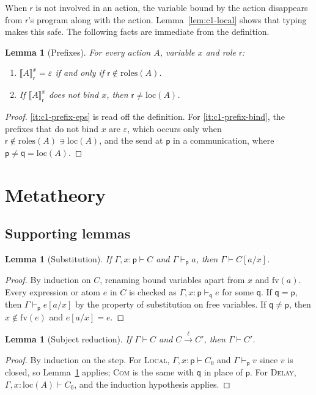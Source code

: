 \documentclass[11pt]{report}
\theoremstyle{plain}
\newtheorem{lemma}[theorem]{Lemma}
\theoremstyle{definition}
\theoremstyle{remark}
\newcommand{\pp}{\mathsf{p}}
\newcommand{\qq}{\mathsf{q}}
\newcommand{\rr}{\mathsf{r}}
\newcommand{\fv}{\mathrm{fv}}
\newcommand{\roles}[1]{\mathrm{roles}(#1)}
\newcommand{\loc}[1]{\mathrm{loc}(#1)}
\newcommand{\lto}[1]{\xrightarrow{\;#1\;}}
\newcommand{\pre}[3]{\llbracket #1 \rrbracket^{#2}_{#3}}
\newcommand{\rn}[1]{{\normalfont\scshape #1}}
\begin{document}
When $\rr$ is not involved in an action, the variable bound by the action
disappears from $\rr$'s program along with the action.
Lemma~\ref{lem:c1-local} shows that typing makes this safe.  The following
facts are immediate from the definition.

\begin{lemma}[Prefixes]\label{lem:c1-prefix}
  For every action $A$, variable $x$ and role $\rr$:
  \begin{enumerate}[label=(\roman*),nosep]
  \item\label{it:c1-prefix-eps} $\pre{A}{x}{\rr}=\varepsilon$ if and only if $\rr\notin\roles{A}$.
  \item\label{it:c1-prefix-bind} If $\pre{A}{x}{\rr}$ does not bind $x$, then $\rr\neq\loc{A}$.
  \end{enumerate}
\end{lemma}
\begin{proof}
  \ref{it:c1-prefix-eps} is read off the definition.  For
  \ref{it:c1-prefix-bind}, the prefixes that do not bind $x$ are $\varepsilon$,
  which occurs only when $\rr\notin\roles{A}\ni\loc{A}$, and the send at $\pp$
  in a communication, where $\pp\neq\qq=\loc{A}$.
\end{proof}

\section{Metatheory}
\label{sec:c1-meta}

\subsection{Supporting lemmas}

\begin{lemma}[Substitution]\label{lem:c1-subst}
  If $\Gamma,x{:}\pp\vdash C$ and $\Gamma\vdash_\pp a$, then $\Gamma\vdash C[a/x]$.
\end{lemma}
\begin{proof}
  By induction on $C$, renaming bound variables apart from $x$ and $\fv(a)$.
  Every expression or atom $e$ in $C$ is checked as $\Gamma,x{:}\pp\vdash_\qq e$
  for some $\qq$.  If $\qq=\pp$, then $\Gamma\vdash_\pp e[a/x]$ by the property of
  substitution on free variables.  If $\qq\neq\pp$, then $x\notin\fv(e)$ and
  $e[a/x]=e$.
\end{proof}

\begin{lemma}[Subject reduction]\label{lem:c1-sr}
  If $\Gamma\vdash C$ and $C\lto{\ell}C'$, then $\Gamma\vdash C'$.
\end{lemma}
\begin{proof}
  By induction on the step.  For \rn{Local}, $\Gamma,x{:}\pp\vdash C_0$ and
  $\Gamma\vdash_\pp v$ since $v$ is closed, so Lemma~\ref{lem:c1-subst}
  applies; \rn{Com} is the same with $\qq$ in place of $\pp$.  For \rn{Delay},
  $\Gamma,x{:}\loc{A}\vdash C_0$, and the induction hypothesis applies.
\end{proof}
\end{document}
